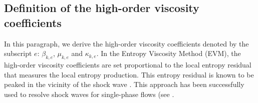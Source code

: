 \documentclass[preprint,10pt]{elsarticle}
\begin{document}
\subsection{Definition of the high-order viscosity coefficients}\label{sec:visc-coeff-ho}
%
In this paragraph, we derive the high-order viscosity coefficients denoted by the subscript $e$: $\beta_{k,e}$, $\mu_{k,e}$ and $\kappa_{k,e}$. 
In the Entropy Viscosity Method (EVM), the high-order viscosity coefficients are set proportional to the local entropy 
residual that measures the local entropy production. This entropy residual is known to be peaked in the vicinity of the shock wave \cite{Leveque}. 
This approach has been successfully used to resolve shock waves for single-phase flows (see \cite{GuermondJCP2011, GuermondCSE2011, GuermondCRA2008,ZinganJCP2013,DelchiniCompFluid2014-euler}. 
\end{document}
